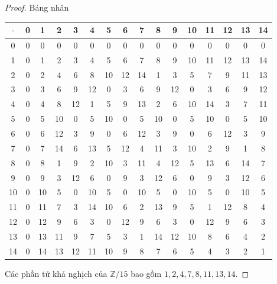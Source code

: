 \begin{proof}
    \par Bảng nhân
    \\
    \begin{tabular}{c|ccccccccccccccc}
        $\cdot$ & 0 & 1  & 2  & 3  & 4  & 5  & 6  & 7  & 8  & 9  & 10 & 11 & 12 & 13 & 14 \\
        \hline
        0       & 0 & 0  & 0  & 0  & 0  & 0  & 0  & 0  & 0  & 0  & 0  & 0  & 0  & 0  & 0  \\
        1       & 0 & 1  & 2  & 3  & 4  & 5  & 6  & 7  & 8  & 9  & 10 & 11 & 12 & 13 & 14 \\
        2       & 0 & 2  & 4  & 6  & 8  & 10 & 12 & 14 & 1  & 3  & 5  & 7  & 9  & 11 & 13 \\
        3       & 0 & 3  & 6  & 9  & 12 & 0  & 3  & 6  & 9  & 12 & 0  & 3  & 6  & 9  & 12 \\
        4       & 0 & 4  & 8  & 12 & 1  & 5  & 9  & 13 & 2  & 6  & 10 & 14 & 3  & 7  & 11 \\
        5       & 0 & 5  & 10 & 0  & 5  & 10 & 0  & 5  & 10 & 0  & 5  & 10 & 0  & 5  & 10 \\
        6       & 0 & 6  & 12 & 3  & 9  & 0  & 6  & 12 & 3  & 9  & 0  & 6  & 12 & 3  & 9  \\
        7       & 0 & 7  & 14 & 6  & 13 & 5  & 12 & 4  & 11 & 3  & 10 & 2  & 9  & 1  & 8  \\
        8       & 0 & 8  & 1  & 9  & 2  & 10 & 3  & 11 & 4  & 12 & 5  & 13 & 6  & 14 & 7  \\
        9       & 0 & 9  & 3  & 12 & 6  & 0  & 9  & 3  & 12 & 6  & 0  & 9  & 3  & 12 & 6  \\
        10      & 0 & 10 & 5  & 0  & 10 & 5  & 0  & 10 & 5  & 0  & 10 & 5  & 0  & 10 & 5  \\
        11      & 0 & 11 & 7  & 3  & 14 & 10 & 6  & 2  & 13 & 9  & 5  & 1  & 12 & 8  & 4  \\
        12      & 0 & 12 & 9  & 6  & 3  & 0  & 12 & 9  & 6  & 3  & 0  & 12 & 9  & 6  & 3  \\
        13      & 0 & 13 & 11 & 9  & 7  & 5  & 3  & 1  & 14 & 12 & 10 & 8  & 6  & 4  & 2  \\
        14      & 0 & 14 & 13 & 12 & 11 & 10 & 9  & 8  & 7  & 6  & 5  & 4  & 3  & 2  & 1
    \end{tabular}

    \bigskip
    \par Các phần tử khả nghịch của $\mathbb{Z}/15$ bao gồm $1, 2, 4, 7, 8, 11, 13, 14$.
\end{proof}

